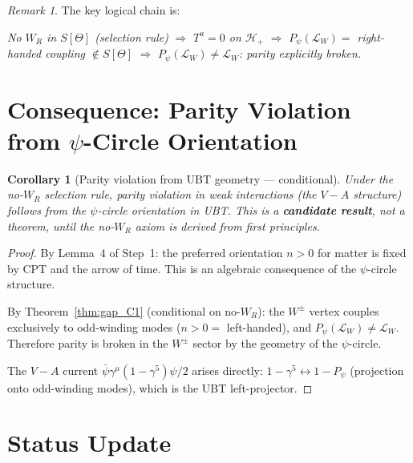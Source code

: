 \documentclass[12pt,a4paper]{article}
\newtheorem{corollary}[theorem]{Corollary}
\theoremstyle{definition}
\theoremstyle{remark}
\newtheorem{remark}[theorem]{Remark}
\begin{document}
\begin{remark}
The key logical chain is:
\begin{center}
\textit{No $W_R$ in $S[\Theta]$ (selection rule)}
$\Longrightarrow$
\textit{$T^a = 0$ on $\mathcal{H}_+$}
$\Longrightarrow$
\textit{$P_\psi(\mathcal{L}_W) = $ right-handed coupling $\notin S[\Theta]$}
$\Longrightarrow$
\textit{$P_\psi(\mathcal{L}_W) \neq \mathcal{L}_W$: parity explicitly broken.}
\end{center}
\end{remark}

\section{Consequence: Parity Violation from $\psi$-Circle Orientation}
\label{sec:consequence}

\begin{corollary}[Parity violation from UBT geometry --- conditional]
\label{cor:parity}
Under the no-$W_R$ selection rule, parity violation in weak interactions
(the $V-A$ structure) follows from the $\psi$-circle orientation in UBT.
This is a \textbf{candidate result}, not a theorem, until the no-$W_R$
axiom is derived from first principles.
\end{corollary}

\begin{proof}
By Lemma~4 of Step~1: the preferred orientation $n > 0$ for matter is
fixed by CPT and the arrow of time.  This is an algebraic consequence of
the $\psi$-circle structure.

By Theorem~\ref{thm:gap_C1} (conditional on no-$W_R$): the $W^\pm$ vertex
couples exclusively to odd-winding modes ($n > 0 = $ left-handed), and
$P_\psi(\mathcal{L}_W) \neq \mathcal{L}_W$.  Therefore parity is broken
in the $W^\pm$ sector by the geometry of the $\psi$-circle.

The $V - A$ current $\bar{\psi}\gamma^\mu(1-\gamma^5)\psi/2$ arises
directly: $1 - \gamma^5 \leftrightarrow 1 - P_\psi$ (projection onto
odd-winding modes), which is the UBT left-projector.
\end{proof}

\section{Status Update}
\label{sec:status}
\end{document}
